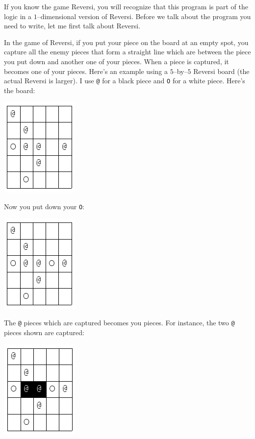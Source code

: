 If you know the game Reversi, you will recognize that this program is part of
the logic in a $1$--dimensional version of Reversi. Before we talk about the
program you need to write, let me first talk about Reversi.

In the game of Reversi, if you put your piece on the board at an empty spot,
you capture all the enemy pieces that form a straight line which are between
the piece you put down and another one of your pieces. When a piece is
captured, it becomes one of your pieces. Here's an example using a $5$--by--$5$
Reversi board (the actual Reversi is larger). I use \verb!@! for a black piece
and \verb!O! for a white piece. Here's the board:

\includegraphics[scale=0.5]{pic1.png}

Now you put down your \verb!O!:

\includegraphics[scale=0.5]{pic2.png}

The \verb!@! pieces which are captured becomes you pieces. For instance, the
two \verb!@! pieces shown are captured:

\includegraphics[scale=0.5]{pic3.png}


